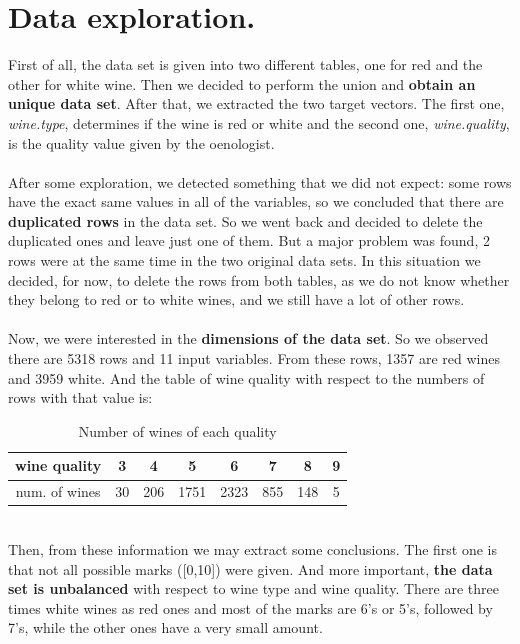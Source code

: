 \documentclass[10pt]{article}
\begin{document}
\section{Data exploration.}
First of all, the data set is given into two different tables, one for red and the other for white wine. Then we decided to perform the union and \textbf{obtain an unique data set}. After that, we extracted the two target vectors. The first one, \textit{wine.type}, determines if the wine is red or white and the second one, \textit{wine.quality}, is the quality value given by the oenologist. \\ \ \\
After some exploration, we detected something that we did not expect: some rows have the exact same values in all of the variables, so we concluded that there are \textbf{duplicated rows} in the data set. So we went back and decided to delete the duplicated ones and leave just one of them. But a major problem was found, 2 rows were at the same time in the two original data sets. In this situation we decided, for now, to delete the rows from both tables, as we do not know whether they belong to red or to white wines, and we still have a lot of other rows. \\ \ \\
Now, we were interested in the \textbf{dimensions of the data set}. So we observed there are 5318 rows and 11 input variables. From these rows, 1357 are red wines and 3959 white. And the table of wine quality with respect to the numbers of rows with that value is:
\begin{table}[H]
\caption{Number of wines of each quality}
\centering
\begin{tabular}{|c|c|c|c|c|c|c|c|}
\hline
wine quality  & 3  & 4   & 5    & 6    & 7    & 8   & 9 \\ \hline
num. of wines & 30 & 206 & 1751 & 2323 & 855  & 148 & 5 \\ \hline
\end{tabular}
\end{table}
\ \\
Then, from these information we may extract some conclusions. The first one is that not all possible marks ([0,10]) were given. And more important, \textbf{the data set is unbalanced} with respect to wine type and wine quality. There are three times white wines as red ones and most of the marks are 6's or 5's, followed by 7's, while the other ones have a very small amount. \\ \ \\
\end{document}
